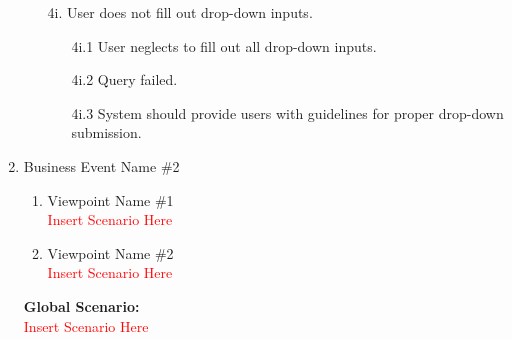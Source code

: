 \documentclass[]{article}
\begin{document}
\begin{enumerate}[{\bf {BE}1.}]
\begin{enumerate}
\begin{enumerate}
      \end{enumerate}
      \item[4i.] User does not fill out drop-down inputs.
      \begin{enumerate}
        \item[4i.1] User neglects to fill out all drop-down inputs.
        \item[4i.2] Query failed.
        \item[4i.3] System should provide users with guidelines for proper drop-down submission.
      \end{enumerate}
    \end{enumerate}


	\item Business Event Name \#2
	\begin{enumerate}[{\bf VP1.}]
		\item Viewpoint Name \#1 \\
		\textcolor{red}{Insert Scenario Here}
		\item Viewpoint Name \#2 \\
		\textcolor{red}{Insert Scenario Here}
	\end{enumerate}
	{\bf Global Scenario:}\\
	\textcolor{red}{Insert Scenario Here}


\end{enumerate}
\end{document}

